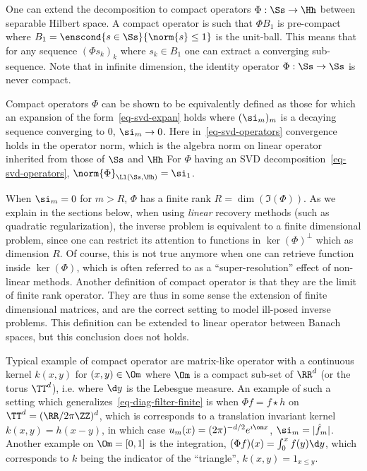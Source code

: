 One can extend the decomposition to compact operators $\Phi : \Ss \rightarrow \Hh$ between separable Hilbert space. A compact operator is such that $\Phi B_1$ is pre-compact where $B_1=\enscond{s \in \Ss}{\norm{s}\leq 1}$ is the unit-ball. This means that for any sequence $(\Phi s_k)_k$ where $s_k \in B_1$ one can extract a converging sub-sequence. Note that in infinite dimension, the identity operator $\Phi : \Ss \rightarrow \Ss$ is never compact.

Compact operators $\Phi$ can be shown to be equivalently defined as those for which an expansion of the form~\eqref{eq-svd-expan} holds
where $(\si_m)_m$ is a decaying sequence converging to $0$, $\si_m \rightarrow 0$.
%
Here in~\eqref{eq-svd-operators} convergence holds in the operator norm, which is the algebra norm on linear operator inherited from those of $\Ss$ and $\Hh$
For $\Phi$ having an SVD decomposition~\eqref{eq-svd-operators}, $\norm{\Phi}_{\Ll(\Ss,\Hh)}=\si_1$.

When $\si_m=0$ for $m>R$, $\Phi$ has a finite rank $R=\dim(\Im(\Phi))$. As we explain in the sections below, when using \textit{linear} recovery methods (such as quadratic regularization), the inverse problem is equivalent to a finite dimensional problem, since one can restrict its attention to functions in $\ker(\Phi)^\bot$ which as dimension $R$. Of course, this is not true anymore when one can retrieve function inside $\ker(\Phi)$, which is often referred to as a ``super-resolution'' effect of non-linear methods.
%
Another definition of compact operator is that they are the limit of finite rank operator. They are thus in some sense the extension of finite dimensional matrices, and are the correct setting to model ill-posed inverse problems. This definition can be extended to linear operator between Banach spaces, but this conclusion does not holds.

Typical example of compact operator are matrix-like operator with a continuous kernel $k(x,y)$ for $(x,y) \in \Om$ where $\Om$ is a compact sub-set of $\RR^d$ (or the torus $\TT^d$), i.e.
where $\d y$ is the Lebesgue measure. 
%
An example of such a setting which generalizes~\eqref{eq-diag-filter-finite} is when $\Phi f = f \star h$ on $\TT^d=(\RR/2\pi\ZZ)^d$, which is corresponds to a translation invariant kernel $k(x,y) = h(x-y)$, in which case $u_m(x)=(2\pi)^{-d/2} e^{\imath \om x}$, $\si_m = |\hat f_m|$.
% 
Another example on $\Om=[0,1]$ is the integration, $(\Phi f)(x) = \int_{0}^x f(y) \d y$, which corresponds to $k$ being the indicator of the ``triangle'', $k(x,y)=1_{x \leq y}$.

